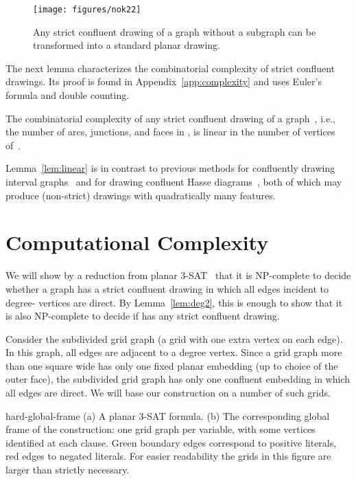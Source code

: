 \documentclass{llncs}
\begin{document}
\begin{figure}[htbp]
	\centering
		\texttt{[image: figures/nok22]}
	\caption{Any strict confluent drawing of a graph without a  subgraph can be transformed into a standard planar drawing.}
	\label{fig:no-k22}
\end{figure}

The next lemma characterizes the combinatorial complexity of strict confluent drawings. Its proof is found in Appendix~\ref{app:complexity} and uses Euler's formula and double counting.

\begin{lemma}\label{lem:linear}
	The combinatorial complexity of any strict confluent drawing  of a graph~, i.e., the number of arcs, junctions, and faces in , is linear in the number of vertices of~. 
\end{lemma}

Lemma~\ref{lem:linear} is in contrast to previous methods for confluently drawing interval graphs~\cite{degm-cd-05} and for drawing confluent Hasse diagrams~\cite{EppSim-GD-11}, both of which may produce (non-strict) drawings with quadratically many features.




\section {Computational Complexity}

We will show by a reduction from planar 3-SAT~\cite{l-pftu-82} that it is NP-complete to decide whether a graph  has a strict confluent drawing in which all edges incident to degree- vertices are direct. By Lemma~\ref {lem:deg2}, this is enough to show that it is also NP-complete to decide if  has any strict confluent drawing.



Consider the subdivided grid graph (a grid with one extra vertex on each edge). In this graph, all edges are adjacent to a degree  vertex. Since a grid graph more than one square wide has only one fixed planar embedding (up to choice of the outer face), the subdivided grid graph has only one confluent embedding in which all edges are direct. We will base our construction on a number of such grids.

 {hard-global-frame}
{ (a) A planar 3-SAT formula.
  (b) The corresponding global frame of the construction: one grid graph per variable, with some vertices identified at each clause. Green boundary edges correspond to positive literals, red edges to negated literals.
      For easier readability the grids in this figure are larger than strictly necessary.
}
\end{document}
